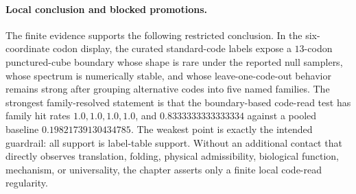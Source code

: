 \paragraph{Local conclusion and blocked promotions.}
The finite evidence supports the following restricted conclusion.  In the six-coordinate codon display, the curated standard-code labels expose a $13$-codon punctured-cube boundary whose shape is rare under the reported null samplers, whose spectrum is numerically stable, and whose leave-one-code-out behavior remains strong after grouping alternative codes into five named families.  The strongest family-resolved statement is that the boundary-based code-read test has family hit rates $1.0,1.0,1.0,1.0$, and $0.8333333333333334$ against a pooled baseline $0.19821739130434785$.  The weakest point is exactly the intended guardrail: all support is label-table support.  Without an additional contact that directly observes translation, folding, physical admissibility, biological function, mechanism, or universality, the chapter asserts only a finite local code-read regularity.
